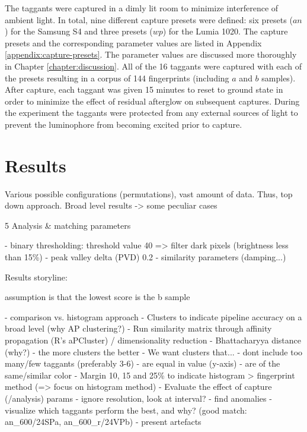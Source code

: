 \documentclass[thesis.tex]{subfiles}
\begin{document}
The taggants were captured in a dimly lit room to minimize interference of ambient light. In total, nine different capture presets were defined: six presets ($an$) for the Samsung S4 and three presets ($wp$) for the Lumia 1020. The capture presets and the corresponding parameter values are listed in Appendix \ref{appendix:capture-presets}. The parameter values are discussed more thoroughly in Chapter \ref{chapter:discussion}. All of the 16 taggants were captured with each of the presets resulting in a corpus of 144 fingerprints (including $a$ and $b$ samples). After capture, each taggant was given 15 minutes to reset to ground state in order to minimize the effect of residual afterglow on subsequent captures. During the experiment the taggants were protected from any external sources of light to prevent the luminophore from becoming excited prior to capture.

\section{Results}
\label{chapter:results}

Various possible configurations (permutations), vast amount of data. Thus, top down approach. Broad level results -> some peculiar cases


5 Analysis \& matching parameters

- binary thresholding: threshold value 40 => filter dark pixels (brightness less than 15\%)
- peak valley delta (PVD) 0.2
- similarity parameters (damping...)

Results storyline:

assumption is that the lowest score is the b sample

- comparison vs. histogram approach
- Clusters to indicate pipeline accuracy on a broad level (why AP clustering?)
  - Run similarity matrix through affinity propagation (R's aPCluster) / dimensionality reduction
  - Bhattacharyya distance (why?)
  - the more clusters the better
  - We want clusters that...
    - dont include too many/few taggants (preferably 3-6)
    - are equal in value (y-axis)
    - are of the same/similar color
- Margin 10, 15 and 25\% to indicate histogram > fingerprint method (=> focus on histogram method)
- Evaluate the effect of capture (/analysis) params
  - ignore resolution, look at interval?
  - find anomalies
  - visualize which taggants perform the best, and why? (good match: an\_600/24SPa, an\_600\_r/24VPb)
- present artefacts
\end{document}

